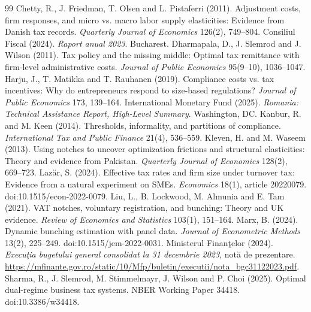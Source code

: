 \documentclass[12pt]{article}
\begin{document}
\begin{thebibliography}{99}
 Chetty, R., J. Friedman, T. Olsen and L. Pistaferri (2011). Adjustment costs, firm responses, and micro vs. macro labor supply elasticities: Evidence from Danish tax records. \emph{Quarterly Journal of Economics} 126(2), 749--804.
 Consiliul Fiscal (2024). \emph{Raport anual 2023}. Bucharest.
 Dharmapala, D., J. Slemrod and J. Wilson (2011). Tax policy and the missing middle: Optimal tax remittance with firm-level administrative costs. \emph{Journal of Public Economics} 95(9--10), 1036--1047.
 Harju, J., T. Matikka and T. Rauhanen (2019). Compliance costs vs. tax incentives: Why do entrepreneurs respond to size-based regulations? \emph{Journal of Public Economics} 173, 139--164.
 International Monetary Fund (2025). \emph{Romania: Technical Assistance Report, High-Level Summary}. Washington, DC.
 Kanbur, R. and M. Keen (2014). Thresholds, informality, and partitions of compliance. \emph{International Tax and Public Finance} 21(4), 536--559.
 Kleven, H. and M. Waseem (2013). Using notches to uncover optimization frictions and structural elasticities: Theory and evidence from Pakistan. \emph{Quarterly Journal of Economics} 128(2), 669--723.
 Laz\u{a}r, S. (2024). Effective tax rates and firm size under turnover tax: Evidence from a natural experiment on SMEs. \emph{Economics} 18(1), article 20220079. doi:10.1515/econ-2022-0079.
 Liu, L., B. Lockwood, M. Almunia and E. Tam (2021). VAT notches, voluntary registration, and bunching: Theory and UK evidence. \emph{Review of Economics and Statistics} 103(1), 151--164.
 Marx, B. (2024). Dynamic bunching estimation with panel data. \emph{Journal of Econometric Methods} 13(2), 225--249. doi:10.1515/jem-2022-0031.
 Ministerul Finan\c{t}elor (2024). \emph{Execu\c{t}ia bugetului general consolidat la 31 decembrie 2023}, not\u{a} de prezentare. \url{https://mfinante.gov.ro/static/10/Mfp/buletin/executii/nota_bgc31122023.pdf}.
 Sharma, R., J. Slemrod, M. Stimmelmayr, J. Wilson and P. Choi (2025). Optimal dual-regime business tax systems. NBER Working Paper 34418. doi:10.3386/w34418.
\end{thebibliography}
\end{document}
